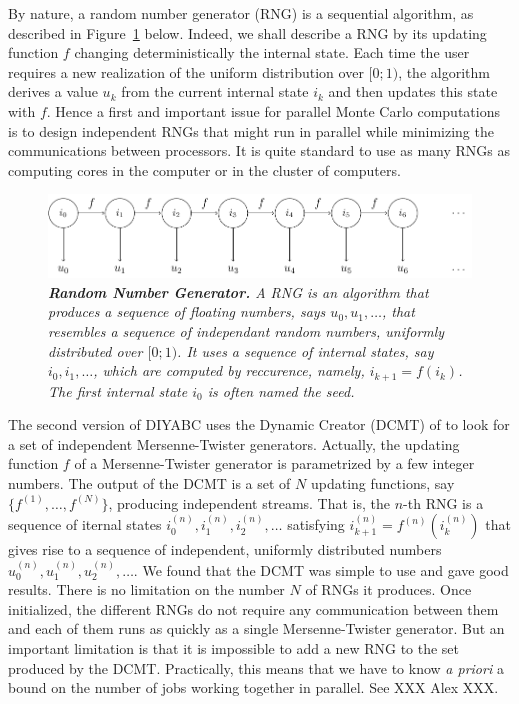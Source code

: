 By nature, a random number generator (RNG) is a sequential algorithm,
as described in Figure~\ref{fig:rng1} below. Indeed, we shall describe a RNG
by its updating function $f$ changing deterministically the internal
state.  Each time the user requires a new realization of the uniform
distribution over $[0;1)$, the algorithm derives a value $u_k$ from
the current internal state $i_k$ and then updates this state with $f$.
Hence a first and important issue for parallel Monte Carlo
computations is to design independent RNGs that might run in parallel
while minimizing the communications between processors. It is quite
standard to use as many RNGs as computing cores in the computer or in
the cluster of computers. 


\begin{figure}[htb]
\centering \it
\begin{minipage}[c]{.6\linewidth}
  \includegraphics[width=\textwidth]{DCMT_rng.pdf}
  \caption[width=.6\textwidth]{\label{fig:rng1} \it\footnotesize
    \textbf{Random Number Generator.} A RNG is an algorithm
    that produces a sequence
    of floating numbers, says $u_0, u_1, \ldots$, that resembles a
    sequence of independant random numbers, uniformly distributed over
    $[0;1)$.
    It uses a sequence of
    internal states, say $i_0, i_1,\ldots$, which are computed by
    reccurence, namely, $i_{k+1}=f(i_k)$. The first internal state
    $i_0$ is often named the seed.}
\end{minipage}
\end{figure}

The second
version of DIYABC uses the Dynamic Creator (DCMT) of
\citet{DCMT} to look for a set of independent
Mersenne-Twister generators. Actually, the updating function $f$ of a
Mersenne-Twister generator is parametrized by a few integer
numbers. 
The output of the DCMT is a set of $N$ updating functions,
say $\{f^{(1)}, \ldots, f^{(N)}\}$, producing independent streams. 
That is, the $n$-th RNG is a sequence of iternal states
$i_0^{(n)},i_1^{(n)}, i_2^{(n)}, \ldots$ satisfying
$i_{k+1}^{(n)}=f^{(n)}(i_k^{(n)})$
that gives rise to a sequence of independent, uniformly distributed numbers
$u_0^{(n)}, u_1^{(n)}, u_2^{(n)},\ldots$.
We found that the DCMT was simple to use and gave good results.  There
is no limitation on the number $N$ of RNGs it produces. Once initialized,
the different RNGs do not require any communication between them and
each of them runs as quickly as a single Mersenne-Twister
generator. But an important limitation is that it is impossible to add a
new RNG to the set produced by the DCMT. Practically, this means that
we have to know \textit{a priori} a bound on the number of
jobs working together in parallel. See XXX Alex XXX.





